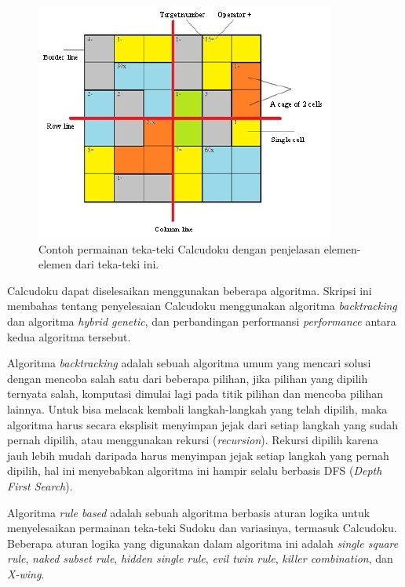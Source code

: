 \begin{figure}
\centering
\captionsetup{justification=centering}
\includegraphics[scale=1]{Gambar/HybridGenetic1}
\caption[Contoh permainan teka-teki Calcudoku dengan penjelasan tentang elemen-elemen dari teka-teki ini. \protect \cite{JohannaLukasSaputra:2012}]{Contoh permainan teka-teki Calcudoku dengan penjelasan elemen-elemen dari teka-teki ini. \protect \cite{JohannaLukasSaputra:2012}}
\label{fig:hybridgenetic1}
\end{figure}

Calcudoku dapat diselesaikan menggunakan beberapa algoritma. Skripsi ini membahas tentang penyelesaian Calcudoku menggunakan algoritma \textit{backtracking} dan algoritma \textit{hybrid genetic}, dan perbandingan performansi \textit{performance} antara kedua algoritma tersebut.

Algoritma \textit{backtracking} adalah sebuah algoritma umum yang mencari solusi dengan mencoba salah satu dari beberapa pilihan, jika pilihan yang dipilih ternyata salah, komputasi dimulai lagi pada titik pilihan dan mencoba pilihan lainnya. Untuk bisa melacak kembali langkah-langkah yang telah dipilih, maka algoritma harus secara eksplisit menyimpan jejak dari setiap langkah yang sudah pernah dipilih, atau menggunakan rekursi (\textit{recursion}). Rekursi dipilih karena jauh lebih mudah daripada harus menyimpan jejak setiap langkah yang pernah dipilih, hal ini menyebabkan algoritma ini hampir selalu berbasis DFS (\textit{Depth First Search}). \cite{Fahda:2015}

Algoritma \textit{rule based} adalah sebuah algoritma berbasis aturan logika untuk menyelesaikan permainan teka-teki Sudoku dan variasinya, termasuk Calcudoku. Beberapa aturan logika yang digunakan dalam algoritma ini adalah \textit{single square rule}, \textit{naked subset rule}, \textit{hidden single rule}, \textit{evil twin rule}, \textit{killer combination}, dan \textit{X-wing}.

